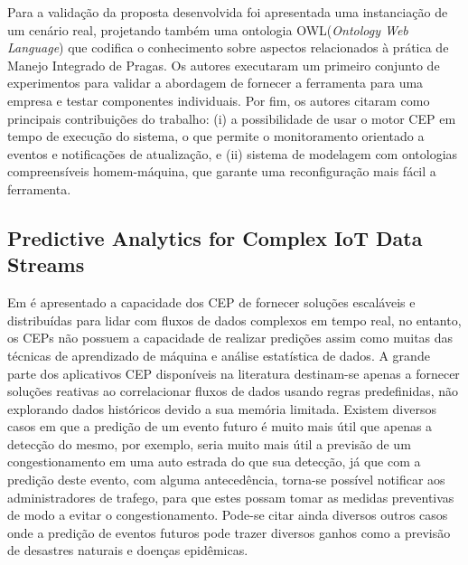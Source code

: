 \documentclass[ti,table]{texufpel} %
\begin{document}
     

    Para a validação da proposta desenvolvida foi apresentada uma instanciação de um cenário real, projetando também uma ontologia OWL(\textit{Ontology Web Language}) que codifica o conhecimento sobre aspectos relacionados à prática de Manejo Integrado de Pragas. Os autores executaram um primeiro conjunto de experimentos para validar a abordagem de fornecer a ferramenta para uma empresa e testar componentes individuais. Por fim, os autores citaram como principais contribuições do trabalho: (i) a possibilidade de usar o motor CEP em tempo de execução do sistema, o que permite o monitoramento orientado a eventos e notificações de atualização, e (ii) sistema de modelagem com ontologias compreensíveis homem-máquina, que garante uma reconfiguração mais fácil a ferramenta.  

     

  

  

\subsection{Predictive Analytics for Complex IoT Data Streams} 

  

  

    Em \cite{art4akbar2017predictive} é apresentado a capacidade dos CEP de fornecer soluções escaláveis e distribuídas para lidar com fluxos de dados complexos em tempo real, no entanto, os CEPs  não possuem a capacidade de realizar predições assim como muitas das técnicas de aprendizado de máquina e análise estatística de dados. A grande parte dos aplicativos CEP disponíveis na literatura destinam-se apenas a fornecer soluções reativas ao correlacionar fluxos de dados usando regras predefinidas, não explorando dados históricos devido a sua memória limitada. Existem diversos casos em que a predição de um evento futuro é muito mais útil que apenas a detecção do mesmo, por exemplo, seria muito mais útil a previsão de um congestionamento em uma auto estrada do que sua detecção, já que com a predição deste evento, com alguma antecedência, torna-se possível notificar aos administradores de trafego, para que estes possam tomar as medidas preventivas de modo a evitar o congestionamento. Pode-se citar ainda diversos outros casos onde a predição de eventos futuros pode trazer diversos ganhos como a previsão de desastres naturais e doenças epidêmicas.  

     
\end{document}
